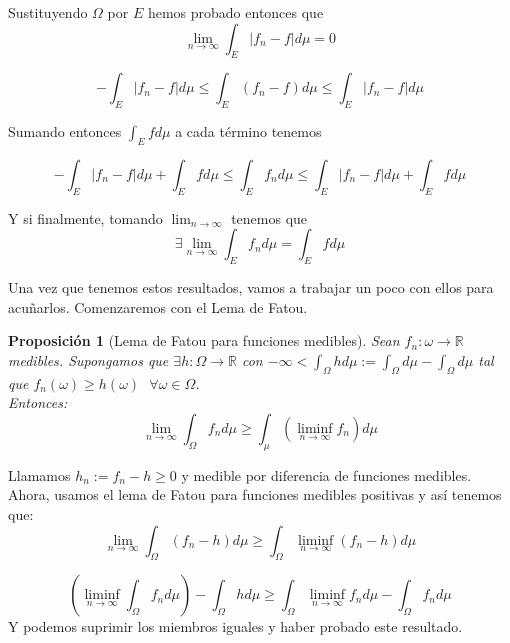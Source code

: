 \documentclass[11pt, a4paper]{article}
\makeatletter
\newif\IfInSansMode
\let\oldsf\sffamily
\renewcommand*{\sffamily}{\oldsf\mathversion{sans}\InSansModetrue}
\let\oldnorm\normalfont
\renewcommand*{\normalfont}{\oldnorm\InSansModefalse\mathversion{normal}}
\providecommand{\abs}[1]{\lvert#1\rvert}
\newcommand{\R}{\mathbb{R}} \newcommand{\N}{\mathbb{N}}
\renewenvironment{proof}[1][\proofname] {\par\pushQED{\qed}\normalfont\topsep6\p@\@plus6\p@\relax\trivlist\item[\hskip\labelsep\itshape\sffamily#1\@addpunct{.}]\ignorespaces}{\popQED\endtrivlist\@endpefalse}
\theoremstyle{theorem-style}
\newtheorem{nprop}{Proposición}[section]
\theoremstyle{definition-style}
\theoremstyle{remark-style}
\theoremstyle{example-style}
\makeatother
\begin{document}
\begin{proof}
  Sustituyendo $\Omega$  por $E$ hemos probado entonces que 
  $$\lim_{n \to \infty} \int_{E} \abs{f_n - f} d \mu = 0$$
  
  $$- \int_E \abs{f_n - f} d \mu \leq \int_E (f_n - f) d \mu \leq \int_E \abs{f_n - f} d \mu$$
  
  Sumando entonces $\displaystyle \int_E f d \mu$ a cada término tenemos
  
  $$ - \int_E \abs{f_n - f} d \mu + \int_E f d \mu \leq \int_E f_n d \mu \leq \int_E \abs{f_n - f} d \mu + \int_E f d \mu$$
  
  Y si finalmente, tomando $\lim_{n \to \infty}$ tenemos que
  $$ \exists \lim_{n \to \infty} \int_E f_n d \mu = \int_E f d \mu$$
\end{proof}

Una vez que tenemos estos resultados, vamos a trabajar un poco con ellos para acuñarlos. Comenzaremos con el Lema de Fatou.

\begin{nprop}[Lema de Fatou para funciones medibles]
  Sean $f_n: \omega \to \R$ medibles. Supongamos que $\exists h: \Omega \to \R$ con $-\infty < \int_\Omega h d\mu := \int_\Omega d\mu - \int_\Omega d\mu $ tal que $f_n(\omega) \geq h(\omega) \ \ \ \forall \omega \in \Omega$.\\
  Entonces:
  $$ \lim_{n\to \infty}\int_\Omega f_n d\mu \geq \int_\mu (\liminf_{n\to \infty}f_n )d\mu$$
\end{nprop}
\begin{proof}
  Llamamos $h_n:= f_n - h \geq 0$ y medible por diferencia de funciones medibles. Ahora, usamos el lema de Fatou para funciones medibles positivas y así tenemos que:
  $$ \lim_{n\to \infty} \int_\Omega (f_n -h) d\mu \geq \int_\Omega \liminf_{n\to \infty}(f_n - h) d\mu$$
  
  $$ ( \liminf_{n\to \infty}\int_\Omega f_n d\mu )  - \int_\Omega h d\mu \geq \int_\Omega \liminf_{n\to \infty} f_n d\mu - \int_\Omega f_n d\mu$$
  Y podemos suprimir los miembros iguales y haber probado este resultado.
\end{proof} 
\end{document}
